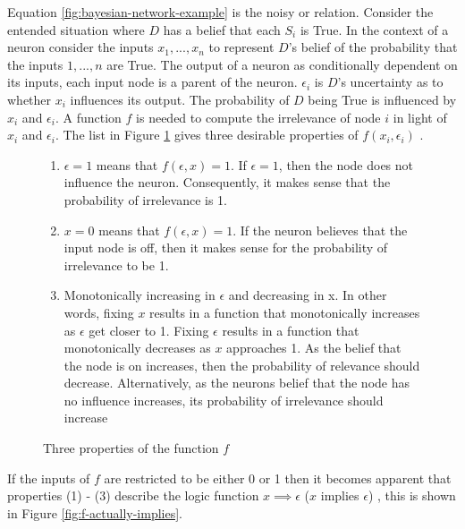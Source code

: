 Equation \ref{fig:bayesian-network-example} is the noisy or relation. Consider the entended situation where $D$ has a belief that each $S_i$ is True. In the context of a neuron consider the inputs $x_1, ..., x_n$ to represent $D$'s belief of the probability that the inputs $1, ..., n$ are True. The output of a neuron as conditionally dependent on its inputs, each input node is a parent of the neuron.  $\epsilon_i$ is $D$'s uncertainty as to whether $x_i$ influences its output. The probability of $D$ being True is influenced by $x_i$ and $\epsilon_i$. A function $f$ is needed to compute the irrelevance of node $i$ in light of $x_i$ and $\epsilon_i$. The list in Figure \ref{fig:irelevence-function-cond} gives three desirable properties of $f(x_i, \epsilon_i)$ \cite{LearningLogicalActivations}.\\

\begin{figure}[H]
\begin{enumerate}
	\item $\epsilon = 1$ means that $f(\epsilon, x) = 1$. If $\epsilon = 1$, then the node does not influence the neuron. Consequently, it makes sense that the probability of irrelevance is 1.
	\item $x = 0$ means that $f(\epsilon, x) = 1$. If the neuron believes that the input node is off, then it makes sense for the probability of irrelevance to be 1.
	\item Monotonically increasing in $\epsilon$ and decreasing in x. In other words, fixing $x$ results in a function that monotonically increases as $\epsilon$ get closer to 1. Fixing $\epsilon$ results in a function that monotonically decreases as $x$ approaches 1. As the belief that the node is on increases, then the probability of relevance should decrease. Alternatively, as the neurons belief that the node has no influence increases, its probability of irrelevance should increase
\end{enumerate}
\caption{Three properties of the function $f$}
\label{fig:irelevence-function-cond}
\end{figure}

If the inputs of $f$ are restricted to be either 0 or 1 then it becomes apparent that properties (1) - (3) describe the logic function $x \implies \epsilon$ ($x$ implies $\epsilon$) , this is shown in Figure \ref{fig:f-actually-implies}. 

